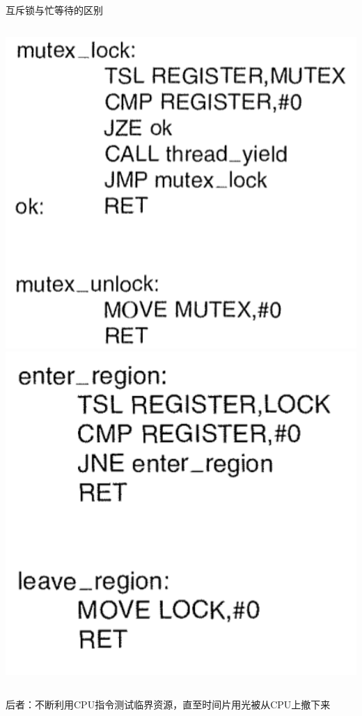 \documentclass[xcolor=svgnames]{beamer}
\begin{document}
\begin{CJK*}{UTF8}{gbsn}
\begin{frame}{互斥锁与忙等待的区别}
\begin{columns}[b]
\includegraphics[width=1.0\textwidth]{mutex.png}
\includegraphics[width=1.0\textwidth]{tsl.png}
\end{columns}%
后者：不断利用CPU指令测试临界资源，直至时间片用光被从CPU上撤下来
\end{frame}


\end{CJK*}
\end{document}
